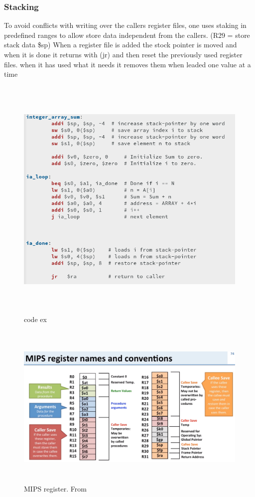 \newpage
\subsubsection{Stacking}
To avoid conflicts with writing over the callers register files, one uses staking in predefined
ranges to allow store data independent from the callers. 
(R29 =  store stack data \$sp)
When a register file is added the stock pointer is moved and when it is done it returns with (jr) and then
reset the previously used register files.
when it has used what it needs it removes them when leaded one value at a time


\begin{figure}[h]
    \vspace{10mm}
    \centering
    \includegraphics[width=16cm, height=12cm]{image/code-ex.png} 
    \caption{code ex}
\end{figure}

\begin{figure}[h]
    \vspace{10mm}
    \centering
    \includegraphics[width=16cm, height=8cm]{image/mips-register.png} 
    \caption{MIPS register. From \cite{}}
\end{figure}


